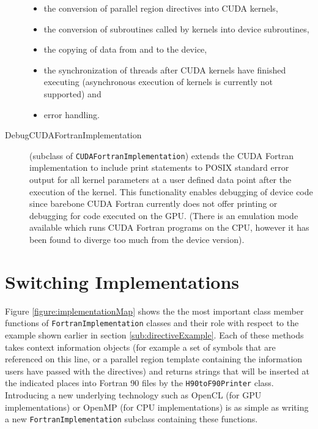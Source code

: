 \begin{description}
\begin{itemize}
  \item the conversion of parallel region directives into CUDA kernels,
  \item the conversion of subroutines called by kernels into device subroutines,
  \item the copying of data from and to the device,
  \item the synchronization of threads after CUDA kernels have finished executing (asynchronous execution of kernels is currently not supported) and
  \item error handling.
 \end{itemize}
 \item[DebugCUDAFortranImplementation] (subclass of \verb|CUDAFortranImplementation|) extends the CUDA Fortran implementation to include print statements to POSIX standard error output for all kernel parameters at a user defined data point after the execution of the kernel. This functionality enables debugging of device code since barebone CUDA Fortran currently does not offer printing or debugging for code executed on the GPU. (There is an emulation mode available which runs CUDA Fortran programs on the CPU, however it has been found to diverge too much from the device version).
\end{description}

\section{Switching Implementations} \label{sub:switchImplementation}

Figure \ref{figure:implementationMap} shows the the most important class member functions of \linebreak
\verb|FortranImplementation| classes and their role with respect to the example shown earlier in section \ref{sub:directiveExample}. Each of these methods takes context information objects (for example a set of symbols that are referenced on this line, or a parallel region template containing the information users have passed with the directives) and returns strings that will be inserted at the indicated places into Fortran 90 files by the \verb|H90toF90Printer| class. Introducing a new underlying technology such as OpenCL (for GPU implementations) or OpenMP (for CPU implementations) is as simple as writing a new \verb|FortranImplementation| subclass containing these functions. 

